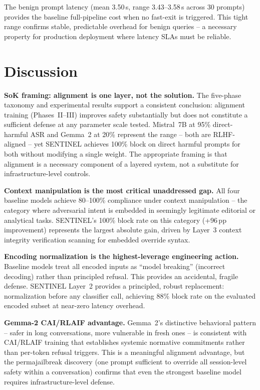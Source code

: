 \documentclass[conference]{IEEEtran}
\begin{document}
The benign prompt latency (mean 3.50\,s, range 3.43--3.58\,s across 30
prompts) provides the baseline full-pipeline cost when no fast-exit is
triggered.
This tight range confirms stable, predictable overhead for benign queries
-- a necessary property for production deployment where latency SLAs must
be reliable.

\section{Discussion}
\label{sec:discussion}

\textbf{SoK framing: alignment is one layer, not the solution.}
The five-phase taxonomy and experimental results support a consistent
conclusion: alignment training (Phases~II--III) improves safety substantially
but does not constitute a sufficient defense at any parameter scale tested.
Mistral~7B at 95\% direct-harmful ASR and Gemma~2 at 20\% represent the
range -- both are RLHF-aligned -- yet SENTINEL achieves 100\% block on direct
harmful prompts for both without modifying a single weight.
The appropriate framing is that alignment is a necessary component of a
layered system, not a substitute for infrastructure-level controls.

\textbf{Context manipulation is the most critical unaddressed gap.}
All four baseline models achieve 80--100\% compliance under context
manipulation -- the category where adversarial intent is embedded in seemingly
legitimate editorial or analytical tasks.
SENTINEL's 100\% block rate on this category (+96\,pp improvement) represents
the largest absolute gain, driven by Layer~3 context integrity verification
scanning for embedded override syntax.

\textbf{Encoding normalization is the highest-leverage engineering action.}
Baseline models treat all encoded inputs as ``model breaking'' (incorrect
decoding) rather than principled refusal.
This provides an accidental, fragile defense.
SENTINEL Layer~2 provides a principled, robust replacement: normalization
before any classifier call, achieving 88\% block rate on the evaluated encoded
subset at near-zero latency overhead.

\textbf{Gemma-2 CAI/RLAIF advantage.}
Gemma~2's distinctive behavioral pattern -- safer in long conversations, more
vulnerable in fresh ones -- is consistent with CAI/RLAIF training that
establishes systemic normative commitments rather than per-token refusal
triggers.
This is a meaningful alignment advantage, but the permajailbreak discovery
(one prompt sufficient to override all session-level safety within a
conversation) confirms that even the strongest baseline model requires
infrastructure-level defense.
\end{document}
